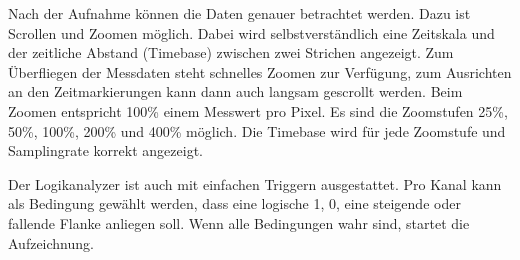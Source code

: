 \documentclass[IN,ngerman,utf8,12pt]{tumbook}
\begin{document}
Nach der Aufnahme können die Daten genauer betrachtet werden.
Dazu ist Scrollen und Zoomen möglich.
Dabei wird selbstverständlich eine Zeitskala und der zeitliche Abstand (Timebase) zwischen zwei Strichen angezeigt.
Zum Überfliegen der Messdaten steht schnelles Zoomen zur Verfügung, zum Ausrichten an den Zeitmarkierungen kann dann auch langsam gescrollt werden.
Beim Zoomen entspricht 100\% einem Messwert pro Pixel.
Es sind die Zoomstufen 25\%, 50\%, 100\%, 200\% und 400\% möglich.
Die Timebase wird für jede Zoomstufe und Samplingrate korrekt angezeigt.

Der Logikanalyzer ist auch mit einfachen Triggern ausgestattet.
Pro Kanal kann als Bedingung gewählt werden, dass eine logische 1, 0, eine steigende oder fallende Flanke anliegen soll.
Wenn alle Bedingungen wahr sind, startet die Aufzeichnung.

%
%
%
%
\end{document}
